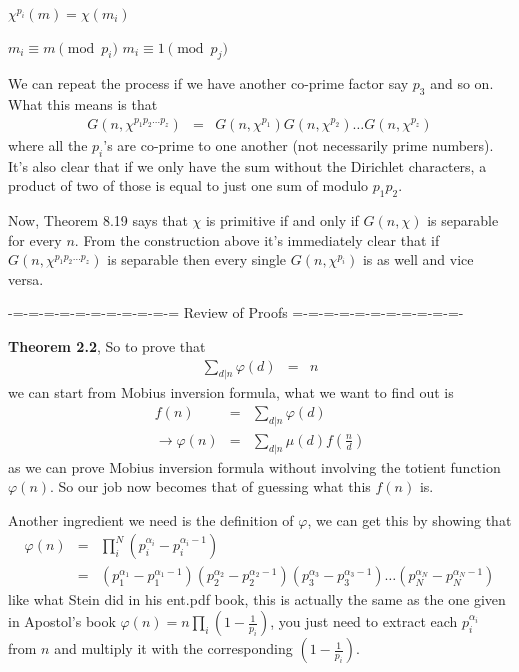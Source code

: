 \documentclass[aps,preprint,preprintnumbers,nofootinbib,showpacs,prd]{revtex4-1}
\newcommand{\nbea}{\begin{eqnarray*}}
\newcommand{\neea}{\end{eqnarray*}}
\begin{document}
$\chi^{p_i}(m) = \chi(m_i)$

$m_i \equiv m \pmod{p_i}$ $m_i \equiv 1 \pmod{p_j}$

We can repeat the process if we have another co-prime factor say $p_3$ and so on. What this means is that
%
\nbea
G(n, \chi^{p_1p_2 \dots p_z}) & = & G(n, \chi^{p_1})G(n, \chi^{p_2}) \dots G(n, \chi^{p_z})
\neea
%
where all the $p_i$'s are co-prime to one another (not necessarily prime numbers). It's also clear that if we only have the sum without the Dirichlet characters, a product of two of those is equal to just one sum of modulo $p_1p_2$.

Now, Theorem 8.19 says that $\chi$ is primitive if and only if $G(n,\chi)$ is separable for every $n$. From the construction above it's immediately clear that if $G(n, \chi^{p_1p_2 \dots p_z})$ is separable then every single $G(n, \chi^{p_i})$ is as well and vice versa.


-=-=-=-=-=-=-=-=-=-=-= Review of Proofs  =-=-=-=-=-=-=-=-=-=-=-


{\bf Theorem 2.2}, So to prove that
%
\nbea
\sum_{d|n}\varphi(d) & = & n
\neea
%
we can start from Mobius inversion formula, what we want to find out is
%
\nbea
f(n) & = & \sum_{d|n} \varphi(d) \\
\to \varphi(n) & = & \sum_{d|n}\mu(d) f\left(\frac{n}{d}\right)
\neea
%
as we can prove Mobius inversion formula without involving the totient function $\varphi(n)$. So our job now becomes that of guessing what this $f(n)$ is.

Another ingredient we need is the definition of $\varphi$, we can get this by showing that 
%
\nbea
\varphi(n) & = & \prod_i^N (p_i^{\alpha_i} - p_i^{\alpha_i-1}) \\
& = & \left ( p_1^{\alpha_1} - p_1^{\alpha_1-1}\right ) \left ( p_2^{\alpha_2} - p_2^{\alpha_2-1}\right ) \left ( p_3^{\alpha_3} - p_3^{\alpha_3-1}\right ) \ldots \left ( p_N^{\alpha_N} - p_N^{\alpha_N-1}\right )
\neea
%
like what Stein did in his ent.pdf book, this is actually the same as the one given in Apostol's book $\varphi(n) = n\prod_i\left(1-\frac{1}{p_i}\right)$, you just need to extract each $p_i^{\alpha_i}$ from $n$ and multiply it with the corresponding $\left(1-\frac{1}{p_i}\right)$.
\end{document}
